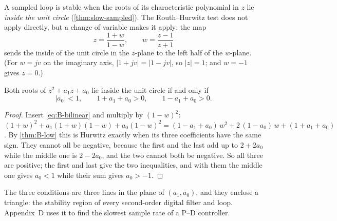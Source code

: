 A sampled loop is stable when the roots of its characteristic polynomial in $z$ lie \emph{inside the unit circle} (\cref{thm:slow-sampled}). The Routh–Hurwitz test does not apply directly, but a change of variable makes it apply: the map
\begin{equation}\label{eq:B-bilinear}
  z = \frac{1 + w}{1 - w}, \qquad w = \frac{z - 1}{z + 1}
\end{equation}
sends the inside of the unit circle in the $z$-plane to the left half of the $w$-plane. (For $w = j v$ on the imaginary axis, $|1 + jv| = |1 - jv|$, so $|z| = 1$; and $w = -1$ gives $z = 0$.)

\begin{theorem}
\label{thm:B-jury}
Both roots of $z^2 + a_1 z + a_0$ lie inside the unit circle if and only if
\begin{equation*}
  |a_0| < 1, \qquad 1 + a_1 + a_0 > 0, \qquad 1 - a_1 + a_0 > 0 .
\end{equation*}
\end{theorem}
\begin{proof}
Insert \cref{eq:B-bilinear} and multiply by $(1 - w)^2$: $(1 + w)^2 + a_1(1 + w)(1 - w) + a_0(1 - w)^2 = (1 - a_1 + a_0)\,w^2 + 2\,(1 - a_0)\,w + (1 + a_1 + a_0)$. By \cref{thm:B-low} this is Hurwitz exactly when its three coefficients have the same sign. They cannot all be negative, because the first and the last add up to $2 + 2a_0$ while the middle one is $2 - 2a_0$, and the two cannot both be negative. So all three are positive; the first and last give the two inequalities, and with them the middle one gives $a_0 < 1$ while their sum gives $a_0 > -1$.
\end{proof}

The three conditions are three lines in the plane of $(a_1, a_0)$, and they enclose a triangle: the stability region of every second-order digital filter and loop. Appendix~D uses it to find the slowest sample rate of a P–D controller.

